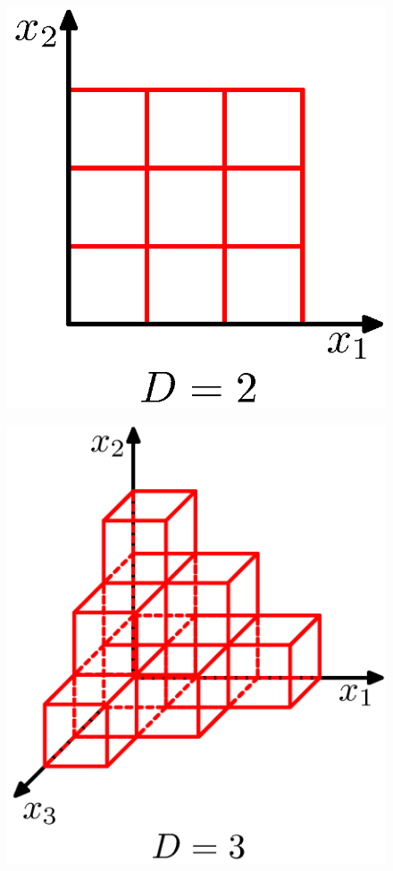 \documentclass[b5paper]{book}
\numberwithin{equation}{chapter}
\begin{document}
{\begin{figure}[ht]
\begin{minipage}[t]{0.3\linewidth}
		\label{fig:1-21a}
		\end{minipage}
		\begin{minipage}[t]{0.3\linewidth}
		\centering
		\includegraphics[scale=0.8]{Images/1-21b.png}
		\label{fig:1-21b}
		\end{minipage} 
		\centering
		\begin{minipage}[t]{0.3\linewidth}
		\includegraphics[scale=0.8]{Images/1-21c.png}

\end{minipage}
\end{figure}}
\end{document}

